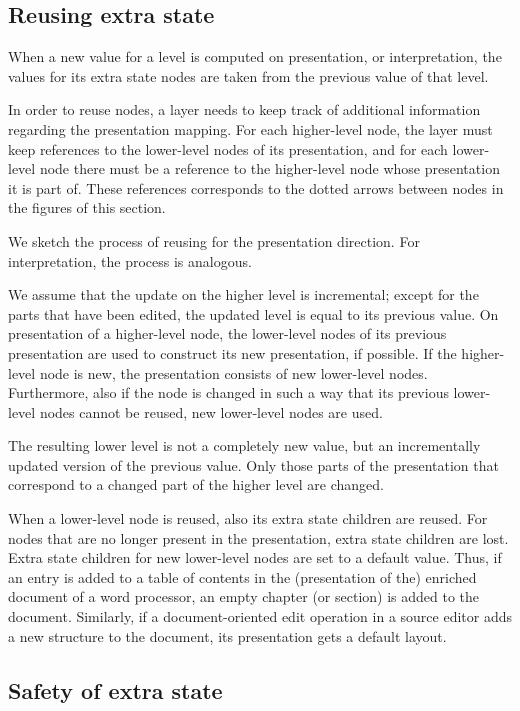 \subsection{Reusing extra state}

When a new value for a level is computed on presentation, or interpretation, the values for its extra state nodes are taken from the previous value of that level. 

In order to reuse nodes, a layer needs to keep track of additional information regarding the presentation mapping. For each higher-level node, the layer must keep references to the lower-level nodes of its presentation, and for each lower-level node there must be  a reference to the higher-level node whose presentation it is part of. These references corresponds to the dotted arrows between nodes in the figures of this section.

We sketch the process of reusing for the presentation direction. For interpretation, the process is analogous.

We assume that the update on the higher level is incremental; except for the parts that have been edited, the updated level is equal to its previous value.  On presentation of a higher-level node, the lower-level nodes of its previous presentation are used to construct its new presentation, if possible. If the higher-level node is new, the presentation consists of new lower-level nodes. Furthermore, also if the node is changed in such a way that its previous lower-level nodes cannot be reused, new lower-level nodes are used.

The resulting lower level is not a completely new value, but an incrementally updated version of the previous value. Only those parts of the presentation that correspond to a changed part of the higher level are changed. 

When a lower-level node is reused, also its extra state children are reused.  For nodes that are no longer present in the presentation, extra state children are lost. Extra state children for new lower-level nodes are set to a default value. Thus, if an entry is added to a table of contents in the (presentation of the) enriched document of a word processor, an empty chapter (or section) is added to the document. Similarly, if a document-oriented edit operation in a source editor adds a new structure to the document, its presentation gets a default layout.


\subsection{Safety of extra state}

